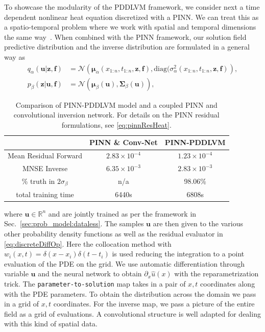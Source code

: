 \documentclass[11pt, fleqn]{article}
\def\z{{\mathbf z}}
\def\fbf{{\mathbf f}}
\def\ubf{{\mathbf u}}
\def\bR{{\mathbb R}}
\def\NPDF{{\mathcal N}}
\def \bmu {{\boldsymbol \mu}}
\def \bSigma {{\mathbf \Sigma}}
\begin{document}
To showcase the modularity of the \gls*{PDDLVM} framework, we consider next a time dependent nonlinear heat equation discretized with a \gls*{PINN}\cite{raissi2019physics}. We can treat this as a spatio-temporal problem where we work with spatial and temporal dimensions the same way~\cite{raissi2019physics}. When combined with the \gls*{PINN} framework, our solution field predictive distribution and the inverse distribution are formulated in a general way as
\begin{align}
    q_{\alpha}(\ubf|\z, \fbf) &= \NPDF\left(\bmu_{\alpha}(x_{1:n}, t_{1:n}, \z, \fbf), \text{diag}(\sigma^2_{\alpha}(x_{1:n},t_{1:n},\z,\fbf)\right),\nonumber\\
    p_{\beta}(\z|\ubf, \fbf) &= \NPDF(\bmu_\beta(\ubf), \bSigma_{\beta}(\ubf)),
\end{align}
\begin{table}[h]
\centering
\begin{tabular}{ c c c }
    \centering
              & PINN \& Conv-Net & PINN-PDDLVM \\ 
    \hline
    Mean Residual Forward    & $2.83 \times 10^{-4}$ & $1.23 \times 10^{-4}$ \\   
    \hline
    MNSE Inverse  & $6.35\times10^{-3}$ & $2.83\times10^{-3}$   \\
    \hline
    \% truth in $2\sigma_{\beta}$ &     n/a              & 98.06\%\\
    \hline
    total training time &  6440s      & 6808s

\end{tabular}
\caption{Comparison of PINN-PDDLVM model and a coupled PINN and convolutional inversion network.  For details on the \gls*{PINN} residual formulations, see \eqref{eq:pinnResHeat}.}
\end{table}
where $\ubf \in \bR^{n}$ and are jointly trained as per the framework in Sec.~\ref{sec:prob_model:dataless}. The samples $\ubf$ are then given to the various other probability density functions as well as the residual evaluator in \eqref{eq:discreteDiffOp}. Here the collocation method with $w_i(x, t) = \delta(x-x_i) \delta(t-t_i)$ is used reducing the integration to a point evaluation of the PDE on the grid. We use automatic differentiation through variable $\ubf$ and the neural network to obtain $\partial_x \hat{u}(x)$ with the reparametrization trick. The \texttt{parameter-to-solution} map takes in a pair of $x,t$ coordinates along with the PDE parameters. To obtain the distribution across the domain we pass in a grid of $x,t$ coordinates. For the inverse map, we pass a picture of the entire field as a grid of evaluations. A convolutional structure is well adapted for dealing with this kind of spatial data.
\end{document}
